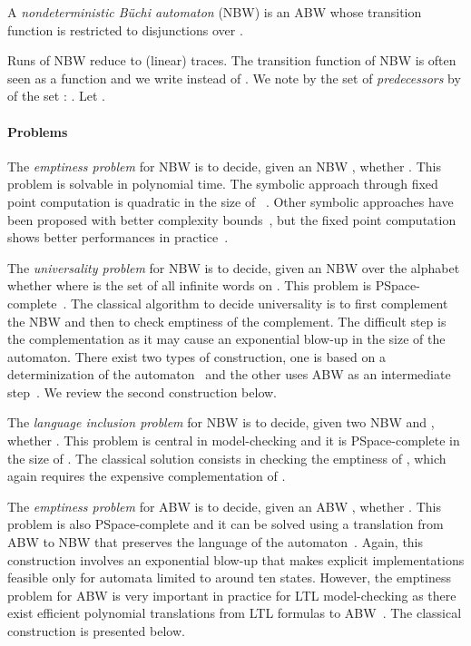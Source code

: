 \documentclass{LMCS}
\begin{document}
\begin{defi}\label{def:NBW}
A \emph{nondeterministic B\"uchi automaton} (NBW) is an ABW whose
transition function is restricted to disjunctions over . 
\end{defi}

Runs of NBW reduce to (linear) traces.  The transition function of NBW is
often seen as a function  and we write
 instead of
. 
We note by  the set of \emph{predecessors} by  
of the set : . Let .



\paragraph{{\bf Problems}} 
The \emph{emptiness problem} for NBW is to decide, given an NBW ,
whether . This problem is solvable in
polynomial time. The symbolic approach through
fixed point computation is quadratic in the size of ~\cite{EmmersonLei86}.
Other symbolic approaches have been proposed with better complexity bounds~\cite{BloemGS00,GentiliniPP03}, 
but the fixed point computation shows better performances in practice~\cite{RaviBS00}.

The \emph{universality problem} for NBW is to decide, given an NBW
 over the alphabet  whether 
where  is the set of all infinite words on .
This problem is {\sc PSpace}-complete~\cite{SVW87}.  The classical algorithm to
decide universality is to first complement the NBW and then to check
emptiness of the complement. The difficult step is the complementation
as it may cause an exponential blow-up in the size of the automaton.
There exist two types of construction, one is based on a
determinization of the automaton~\cite{Safra88} and the other uses ABW
as an intermediate step~\cite{kupferman97weak}. We review the second 
construction below.

The \emph{language inclusion problem} for NBW is to decide, given two
NBW  and , whether . This
problem is central in model-checking and it is {\sc PSpace}-complete in the size of . 
The classical solution consists in checking the
emptiness of , which again requires the
expensive complementation of .

The \emph{emptiness problem} for ABW is to decide, given an ABW ,
whether . This problem is also {\sc
  PSpace}-complete and it can be solved using a translation from ABW
to NBW that preserves the language of the automaton~\cite{MiyanoH84}.
Again, this construction involves an exponential blow-up that makes
explicit implementations feasible only for automata limited to around
ten states. However, the emptiness problem for ABW is very important
in practice for LTL model-checking as there exist efficient polynomial
translations from LTL formulas to ABW~\cite{GastinOddoux}. The classical
construction is presented below.
\end{document}
